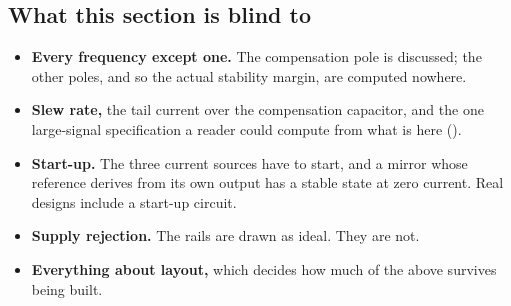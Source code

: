 \subsection{What this section is blind to}
\label{c10:sec:a7}
\begin{itemize}
  \item \textbf{Every frequency except one.} The compensation pole is discussed; the other poles, and so the actual stability margin, are computed nowhere.
  \item \textbf{Slew rate,} the tail current over the compensation capacitor, and the one large-signal specification a reader could compute from what is here ().
  \item \textbf{Start-up.} The three current sources have to start, and a mirror whose reference derives from its own output has a stable state at zero current. Real designs include a start-up circuit.
  \item \textbf{Supply rejection.} The rails are drawn as ideal. They are not.
  \item \textbf{Everything about layout,} which decides how much of the above survives being built.
\end{itemize}
